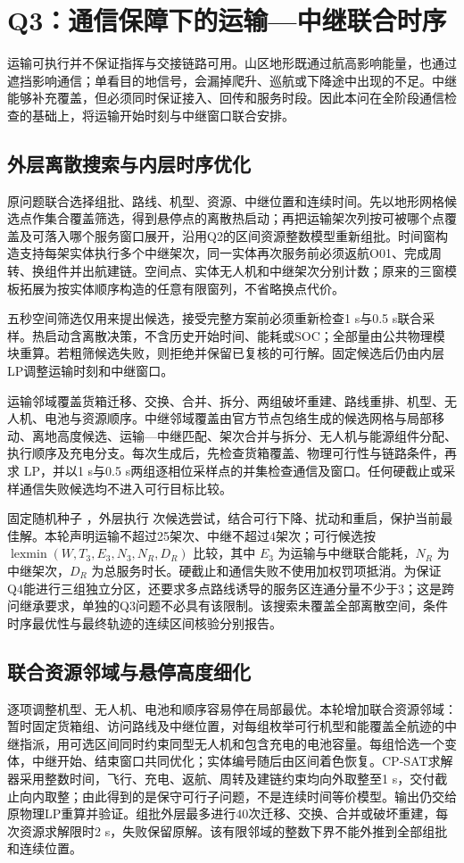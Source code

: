 \section{Q3：通信保障下的运输—中继联合时序}\label{sec:q3}
运输可执行并不保证指挥与交接链路可用。山区地形既通过航高影响能量，也通过遮挡影响通信；单看目的地信号，会漏掉爬升、巡航或下降途中出现的不足。中继能够补充覆盖，但必须同时保证接入、回传和服务时段\cite{zeng}。因此本问在全阶段通信检查的基础上，将运输开始时刻与中继窗口联合安排。

\subsection{外层离散搜索与内层时序优化}
原问题联合选择组批、路线、机型、资源、中继位置和连续时间。先以地形网格候选点作集合覆盖筛选，得到悬停点的离散热启动；再把运输架次列按可被哪个点覆盖及可落入哪个服务窗口展开，沿用Q2的区间资源整数模型重新组批。时间窗构造支持每架实体执行多个中继架次，同一实体再次服务前必须返航O01、完成周转、换组件并出航建链。空间点、实体无人机和中继架次分别计数；原来的三窗模板拓展为按实体顺序构造的任意有限窗列，不省略换点代价。

五秒空间筛选仅用来提出候选，接受完整方案前必须重新检查1 s与0.5 s联合采样。热启动含离散决策，不含历史开始时间、能耗或SOC；全部量由公共物理模块重算。若粗筛候选失败，则拒绝并保留已复核的可行解。固定候选后仍由内层LP调整运输时刻和中继窗口。

运输邻域覆盖货箱迁移、交换、合并、拆分、两组破坏重建、路线重排、机型、无人机、电池与资源顺序。中继邻域覆盖由官方节点包络生成的候选网格与局部移动、离地高度候选、运输—中继匹配、架次合并与拆分、无人机与能源组件分配、执行顺序及充电分支。每次生成后，先检查货箱覆盖、物理可行性与链路条件，再求 LP，并以1 s与0.5 s两组逐相位采样点的并集检查通信及窗口。任何硬截止或采样通信失败候选均不进入可行目标比较。

固定随机种子 \SearchSeed{}，外层执行 \QThreeIterations{} 次候选尝试，结合可行下降、扰动和重启，保护当前最佳解。本轮声明运输不超过25架次、中继不超过4架次；可行候选按 $\operatorname{lexmin}(W,T_3,E_3,N_3,N_R,D_R)$ 比较，其中 $E_3$ 为运输与中继联合能耗，$N_R$ 为中继架次，$D_R$ 为总服务时长。硬截止和通信失败不使用加权罚项抵消。为保证Q4能进行三组独立分区，还要求多点路线诱导的服务区连通分量不少于3；这是跨问继承要求，单独的Q3问题不必具有该限制。该搜索未覆盖全部离散空间，条件时序最优性与最终轨迹的连续区间核验分别报告。

\subsection{联合资源邻域与悬停高度细化}
逐项调整机型、无人机、电池和顺序容易停在局部最优。本轮增加联合资源邻域：暂时固定货箱组、访问路线及中继位置，对每组枚举可行机型和能覆盖全航迹的中继指派，用可选区间同时约束同型无人机和包含充电的电池容量。每组恰选一个变体，中继开始、结束窗口共同优化；实体编号随后由区间着色恢复。CP-SAT求解器采用整数时间\cite{cpsat}，飞行、充电、返航、周转及建链约束均向外取整至1 s，交付截止向内取整；由此得到的是保守可行子问题，不是连续时间等价模型。输出仍交给原物理LP重算并验证。组批外层最多进行40次迁移、交换、合并或破坏重建，每次资源求解限时2 s，失败保留原解。该有限邻域的整数下界不能外推到全部组批和连续位置。

